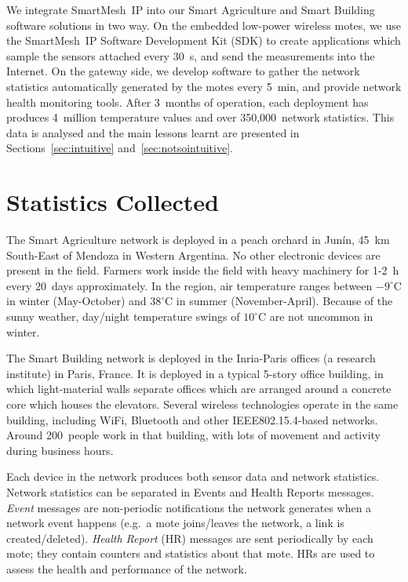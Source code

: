 \documentclass{elsarticle}
\newcommand{\smip}                {SmartMesh~IP\xspace}
\newcommand{\building}            {Smart Building\xspace}
\newcommand{\agri}                {Smart Agriculture\xspace}
\begin{document}

We integrate \smip into our \agri and \building software solutions in two way.
On the embedded low-power wireless motes, we use the \smip Software Development Kit (SDK) to create applications which sample the sensors attached every 30~s, and send the measurements into the Internet.
On the gateway side, we develop software to gather the network statistics automatically generated by the motes every 5~min, and provide network health monitoring tools.
After 3~months of operation, each deployment has produces 4~million temperature values and over 350,000~network statistics.
This data is analysed and the main lessons learnt are presented in Sections~\ref{sec:intuitive} and~\ref{sec:notsointuitive}.

\section{Statistics Collected}
\label{sec:collected}


The \agri network is deployed in a peach orchard in Jun\'in, 45~km South-East of Mendoza in Western Argentina.
No other electronic devices are present in the field.
Farmers work inside the field with heavy machinery for 1-2~h every 20~days approximately.
In the region, air temperature ranges between $-9^{\circ}$C in winter (May-October) and $38^{\circ}$C in summer (November-April).
Because of the sunny weather, day/night temperature swings of $10^{\circ}$C are not uncommon in winter.

The \building network is deployed in the Inria-Paris offices (a research institute) in Paris, France.
It is deployed in a typical 5-story office building, in which light-material walls separate offices which are arranged around a concrete core which houses the elevators.
Several wireless technologies operate in the same building, including WiFi, Bluetooth and other IEEE802.15.4-based networks.
Around 200~people work in that building, with lots of movement and activity during business hours.


Each device in the network produces both sensor data and network statistics.
Network statistics can be separated in Events and Health Reports messages.
\textit{Event} messages are non-periodic notifications the network generates when a network event happens (e.g.~a mote joins/leaves the network, a link is created/deleted).
\textit{Health Report} (HR) messages are sent periodically by each mote; they contain counters and statistics about that mote.
HRs are used to assess the health and performance of the network.
\end{document}

